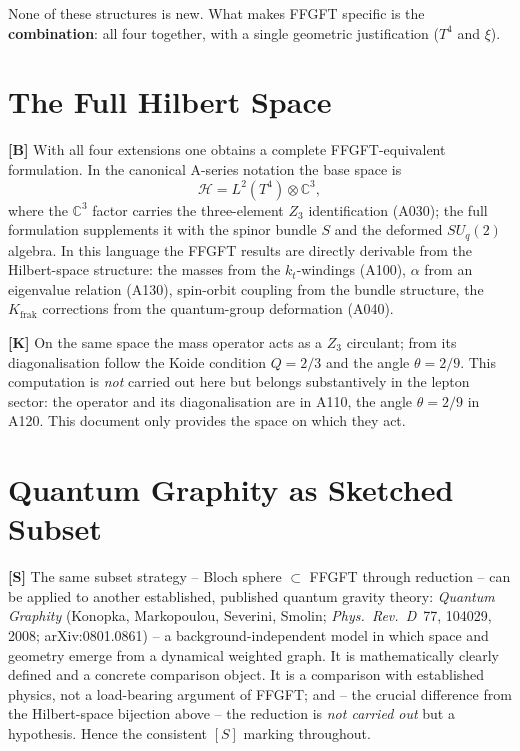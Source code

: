 None of these structures is new. What makes FFGFT specific is the
\textbf{combination}: all four together, with a single geometric justification
($T^4$ and $\xi$).

\section{The Full Hilbert Space}

\textbf{[B]} With all four extensions one obtains a complete FFGFT-equivalent
formulation. In the canonical A-series notation the base space is
\[
  \mathcal{H} = L^2(T^4)\otimes\mathbb{C}^3,
\]
where the $\mathbb{C}^3$ factor carries the three-element $Z_3$ identification
(A030); the full formulation supplements it with the spinor bundle $S$ and the
deformed $SU_q(2)$ algebra. In this language the FFGFT results are directly
derivable from the Hilbert-space structure: the masses from the $k_t$-windings
(A100), $\alpha$ from an eigenvalue relation (A130), spin-orbit coupling from the
bundle structure, the $K_{\text{frak}}$ corrections from the quantum-group
deformation (A040).

\textbf{[K]} On the same space the mass operator acts as a $Z_3$ circulant; from
its diagonalisation follow the Koide condition $Q=2/3$ and the angle $\theta=2/9$.
This computation is \emph{not} carried out here but belongs substantively in the
lepton sector: the operator and its diagonalisation are in A110, the angle
$\theta=2/9$ in A120. This document only provides the space on which they act.

\section{Quantum Graphity as Sketched Subset}

\textbf{[S]} The same subset strategy -- Bloch sphere $\subset$ FFGFT through
reduction -- can be applied to another established, published quantum gravity
theory: \emph{Quantum Graphity} (Konopka, Markopoulou, Severini, Smolin;
\emph{Phys.~Rev.~D}~77, 104029, 2008; arXiv:0801.0861) -- a background-independent
model in which space and geometry emerge from a dynamical weighted graph. It is
mathematically clearly defined and a concrete comparison object. It is a comparison
with established physics, not a load-bearing argument of FFGFT; and -- the crucial
difference from the Hilbert-space bijection above -- the reduction is \emph{not
carried out} but a hypothesis. Hence the consistent $[S]$ marking throughout.

